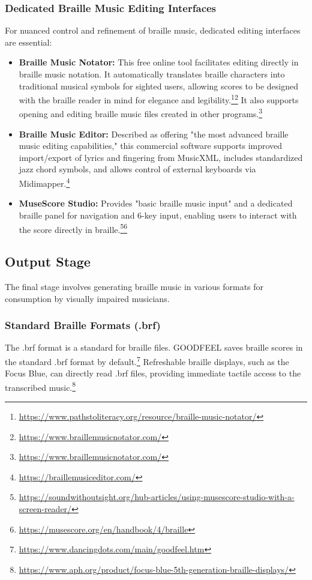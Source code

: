 \subsubsection{Dedicated Braille Music Editing Interfaces}
For nuanced control and refinement of braille music, dedicated editing interfaces are essential:
\begin{itemize}[noitemsep,topsep=0pt]
    \item \textbf{Braille Music Notator:} This free online tool facilitates editing directly in braille music notation. It automatically translates braille characters into traditional musical symbols for sighted users, allowing scores to be designed with the braille reader in mind for elegance and legibility.\footnote{\url{https://www.pathstoliteracy.org/resource/braille-music-notator/}}\footnote{\url{https://www.braillemusicnotator.com/}} It also supports opening and editing braille music files created in other programs.\footnote{\url{https://www.braillemusicnotator.com/}}
    \item \textbf{Braille Music Editor:} Described as offering "the most advanced braille music editing capabilities," this commercial software supports improved import/export of lyrics and fingering from MusicXML, includes standardized jazz chord symbols, and allows control of external keyboards via Midimapper.\footnote{\url{https://braillemusiceditor.com/}}
    \item \textbf{MuseScore Studio:} Provides "basic braille music input" and a dedicated braille panel for navigation and 6-key input, enabling users to interact with the score directly in braille.\footnote{\url{https://soundwithoutsight.org/hub-articles/using-musescore-studio-with-a-screen-reader/}}\footnote{\url{https://musescore.org/en/handbook/4/braille}}
\end{itemize}

\subsection{Output Stage}
The final stage involves generating braille music in various formats for consumption by visually impaired musicians.

\subsubsection{Standard Braille Formats (.brf)}
The .brf format is a standard for braille files. GOODFEEL saves braille scores in the standard .brf format by default.\footnote{\url{https://www.dancingdots.com/main/goodfeel.htm}} Refreshable braille displays, such as the Focus Blue, can directly read .brf files, providing immediate tactile access to the transcribed music.\footnote{\url{https://www.aph.org/product/focus-blue-5th-generation-braille-displays/}}

